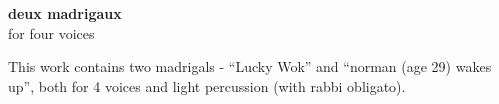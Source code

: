 \documentclass[a4paper]{book}
\begin{document}
\begin{titlepage}
\begin{flushright}
{\Huge \bfseries deux madrigaux \\ }
{\large for four voices \\}
\par
{}
\end{flushright}
\end{titlepage}
\thispagestyle{empty} 
 \begin{center}
This work contains two madrigals - ``Lucky Wok'' and ``norman (age 29) wakes
up'', both for 4 voices and light percussion (with rabbi obligato).
\end{center}
\end{document}
